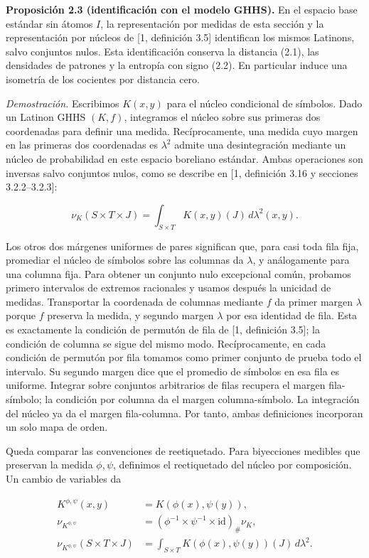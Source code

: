 \documentclass[spanish,11pt,a4paper]{article}
\begin{document}
\textbf{Proposición 2.3 (identificación con el modelo GHHS).} En el espacio base estándar sin átomos \(I\), la representación por medidas de esta sección y la representación por núcleos de {[}1, definición 3.5{]} identifican los mismos Latinons, salvo conjuntos nulos. Esta identificación conserva la distancia (2.1), las densidades de patrones y la entropía con signo (2.2). En particular induce una isometría de los cocientes por distancia cero.

\emph{Demostración.} Escribimos \(K(x,y)\) para el núcleo condicional de símbolos. Dado un Latinon GHHS \((K,f)\), integramos el núcleo sobre sus primeras dos coordenadas para definir una medida. Recíprocamente, una medida cuyo margen en las primeras dos coordenadas es \(\lambda^2\) admite una desintegración mediante un núcleo de probabilidad en este espacio boreliano estándar. Ambas operaciones son inversas salvo conjuntos nulos, como se describe en {[}1, definición 3.16 y secciones 3.2.2--3.2.3{]}:

\nopagebreak[4]
\[\nu_K(S\times T\times J)=\int_{S\times T}K(x,y)(J)\,d\lambda^2(x,y).
\tag{2.9}\]

Los otros dos márgenes uniformes de pares significan que, para casi toda fila fija, promediar el núcleo de símbolos sobre las columnas da \(\lambda\), y análogamente para una columna fija. Para obtener un conjunto nulo excepcional común, probamos primero intervalos de extremos racionales y usamos después la unicidad de medidas. Transportar la coordenada de columnas mediante \(f\) da primer margen \(\lambda\) porque \(f\) preserva la medida, y segundo margen \(\lambda\) por esa identidad de fila. Esta es exactamente la condición de permutón de fila de {[}1, definición 3.5{]}; la condición de columna se sigue del mismo modo. Recíprocamente, en cada condición de permutón por fila tomamos como primer conjunto de prueba todo el intervalo. Su segundo margen dice que el promedio de símbolos en esa fila es uniforme. Integrar sobre conjuntos arbitrarios de filas recupera el margen fila-símbolo; la condición por columna da el margen columna-símbolo. La integración del núcleo ya da el margen fila-columna. Por tanto, ambas definiciones incorporan un solo mapa de orden.

Queda comparar las convenciones de reetiquetado. Para biyecciones medibles que preservan la medida \(\phi,\psi\), definimos el reetiquetado del núcleo por composición. Un cambio de variables da

\nopagebreak[4]
\[\begin{aligned}
K^{\phi,\psi}(x,y)&=K(\phi(x),\psi(y)),\\
\nu_{K^{\phi,\psi}}&=(\phi^{-1}\times\psi^{-1}\times\mathrm{id})_\#\nu_K,\\
\nu_{K^{\phi,\psi}}(S\times T\times J)
&=\int_{S\times T}K(\phi(x),\psi(y))(J)\,d\lambda^2.
\end{aligned}\tag{2.10}\]
\end{document}
